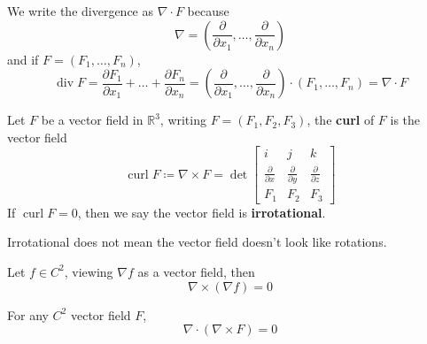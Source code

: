 \documentclass[openany]{book}
\newcommand{\R}{\mathbb{R}}
\newcommand{\diverg}{\operatorname{div}}
\newcommand{\curl}{\operatorname{curl}}
\begin{document}
\begin{remark}
    We write the divergence as $\nabla\cdot F$ because 
    \begin{equation*}
        \nabla=\left(\frac{\partial}{\partial x_1}, \dots, \frac{\partial}{\partial x_n}\right)
    \end{equation*}
    and if $F=(F_1,\dots, F_n)$, 
    \begin{equation*}
        \diverg F=\frac{\partial F_1}{\partial x_1}+\dots+\frac{\partial F_n}{\partial x_n}=\left(\frac{\partial}{\partial x_1}, \dots, \frac{\partial}{\partial x_n}\right)\cdot(F_1,\dots, F_n)=\nabla\cdot F
    \end{equation*}
\end{remark}


\begin{defn}[curl]
    Let $F$ be a vector field in $\R^3$, writing $F=(F_1,F_2,F_3)$, the \textbf{curl} of $F$ is the vector field 
    \begin{equation*}
        \curl F\coloneq\nabla\times F=\det\begin{bmatrix}
            i&j&k\\
            \frac{\partial}{\partial x}&\frac{\partial}{\partial y}&\frac{\partial}{\partial z}\\
            F_1&F_2&F_3
        \end{bmatrix}
    \end{equation*}
    If $\curl F=0$, then we say the vector field is \textbf{irrotational}.
\end{defn}
\begin{warn}
    Irrotational does not mean the vector field doesn't look like rotations.
\end{warn}

\begin{prop}
    Let $f\in C^2$, viewing $\nabla f$ as a vector field, then
    \begin{equation*}
        \nabla\times(\nabla f)=0
    \end{equation*}    
\end{prop}

\begin{prop}
    For any $C^2$ vector field $F$, 
    \begin{equation*}
        \nabla\cdot(\nabla\times F)=0
    \end{equation*}
\end{prop}
\end{document}
